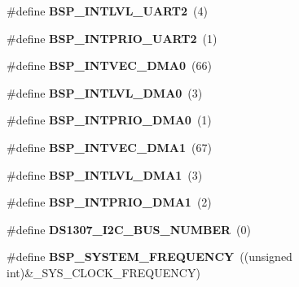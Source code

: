 \begin{DoxyCompactItemize}
\#define {\bfseries B\+S\+P\+\_\+\+I\+N\+T\+L\+V\+L\+\_\+\+U\+A\+R\+T2}~(4)
\item 
\mbox{\label{group__RTEMSBSPsM68kMCF5206Elite_gaf0ff3d8da1a8d69e0be46d8128b41abe}} 
\#define {\bfseries B\+S\+P\+\_\+\+I\+N\+T\+P\+R\+I\+O\+\_\+\+U\+A\+R\+T2}~(1)
\item 
\mbox{\label{group__RTEMSBSPsM68kMCF5206Elite_ga44a10190c9ae72211a89378cfa56f986}} 
\#define {\bfseries B\+S\+P\+\_\+\+I\+N\+T\+V\+E\+C\+\_\+\+D\+M\+A0}~(66)
\item 
\mbox{\label{group__RTEMSBSPsM68kMCF5206Elite_gac49095c1dd924e95d2b01314bfabbd00}} 
\#define {\bfseries B\+S\+P\+\_\+\+I\+N\+T\+L\+V\+L\+\_\+\+D\+M\+A0}~(3)
\item 
\mbox{\label{group__RTEMSBSPsM68kMCF5206Elite_ga5d0aba25d8ad734bf4e381cfa0337688}} 
\#define {\bfseries B\+S\+P\+\_\+\+I\+N\+T\+P\+R\+I\+O\+\_\+\+D\+M\+A0}~(1)
\item 
\mbox{\label{group__RTEMSBSPsM68kMCF5206Elite_ga52e59c0d1bc38721650068c9cd94b90e}} 
\#define {\bfseries B\+S\+P\+\_\+\+I\+N\+T\+V\+E\+C\+\_\+\+D\+M\+A1}~(67)
\item 
\mbox{\label{group__RTEMSBSPsM68kMCF5206Elite_gacfe9e2b83b84a47c7b2d05d708b9b96f}} 
\#define {\bfseries B\+S\+P\+\_\+\+I\+N\+T\+L\+V\+L\+\_\+\+D\+M\+A1}~(3)
\item 
\mbox{\label{group__RTEMSBSPsM68kMCF5206Elite_ga9f147344e31d5aaa4f93aed90b14f315}} 
\#define {\bfseries B\+S\+P\+\_\+\+I\+N\+T\+P\+R\+I\+O\+\_\+\+D\+M\+A1}~(2)
\item 
\mbox{\label{group__RTEMSBSPsM68kMCF5206Elite_ga6879abb1c9c7cd414332a7b049ccaec6}} 
\#define {\bfseries D\+S1307\+\_\+\+I2\+C\+\_\+\+B\+U\+S\+\_\+\+N\+U\+M\+B\+ER}~(0)
\item 
\mbox{\label{group__RTEMSBSPsM68kMCF5206Elite_ga365627812fa6e2775063d6e211d240ad}} 
\#define {\bfseries B\+S\+P\+\_\+\+S\+Y\+S\+T\+E\+M\+\_\+\+F\+R\+E\+Q\+U\+E\+N\+CY}~((unsigned int)\&\+\_\+\+S\+Y\+S\+\_\+\+C\+L\+O\+C\+K\+\_\+\+F\+R\+E\+Q\+U\+E\+N\+CY)

\end{DoxyCompactItemize}
